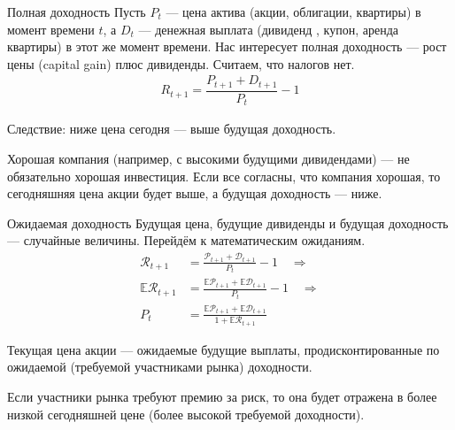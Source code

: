\documentclass{beamer}
\begin{document}
\begin{frame}{Полная доходность}
\justify
Пусть $P_t$ --- цена актива (акции, облигации, квартиры) в момент времени $t$, 
а $D_t$ --- денежная выплата (дивиденд , купон, аренда квартиры) в этот же 
момент времени. Нас интересует полная доходность --- рост цены (capital gain) 
плюс дивиденды. Считаем, что налогов нет.
\begin{align*}
R_{t+1} = \dfrac{P_{t+1} + D_{t+1}}{P_t} - 1
\end{align*}

\justify
Следствие: ниже цена сегодня --- выше будущая доходность.

\justify
Хорошая компания (например, с высокими будущими дивидендами) --- не обязательно 
хорошая инвестиция. Если все согласны, что компания хорошая, то сегодняшняя 
цена акции будет выше, а будущая доходность --- ниже.
\end{frame}



\begin{frame}{Ожидаемая доходность}
\justify
Будущая цена, будущие дивиденды и будущая доходность --- случайные величины. 
Перейдём к математическим ожиданиям.
\begin{align*}
\mathcal{R}_{t+1} 
&= \frac{\mathcal{P}_{t+1} + \mathcal{D}_{t+1}}{P_t} - 1   
\quad \Rightarrow \\
\mathbb{E}\mathcal{R}_{t+1}
&= \frac{\mathbb{E}\mathcal{P}_{t+1} + \mathbb{E}\mathcal{D}_{t+1}}{P_t} - 1 
\quad \Rightarrow \\
P_t &=
\frac{\mathbb{E}\mathcal{P}_{t+1} + \mathbb{E}\mathcal{D}_{t+1}}{1 + \mathbb{E}\mathcal{R}_{t+1}}
\end{align*}

\justify
Текущая цена акции --- ожидаемые будущие выплаты, продисконтированные по 
ожидаемой (требуемой участниками рынка) доходности.

\justify
Если участники рынка требуют премию за риск, то она будет отражена в более 
низкой сегодняшней цене (более высокой требуемой доходности). 
\end{frame}
\end{document}
